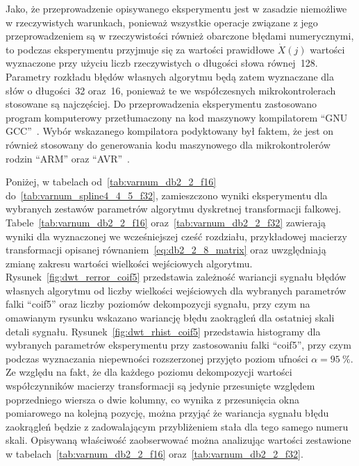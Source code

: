 Jako, że przeprowadzenie opisywanego eksperymentu jest w zasadzie niemożliwe w rzeczywistych warunkach, ponieważ wszystkie operacje związane z jego przeprowadzeniem są w rzeczywistości również obarczone błędami numerycznymi, to podczas eksperymentu przyjmuje się za wartości prawidłowe $\dot{X}(j)$ wartości wyznaczone przy użyciu liczb rzeczywistych o długości słowa równej~\qty{128}{\bitOw}. Parametry rozkładu błędów własnych algorytmu będą zatem wyznaczane dla słów o długości~\qty{32}{\bitOw} oraz~\qty{16}{\bitOw}, ponieważ te we współczesnych mikrokontrolerach stosowane są najczęściej. Do przeprowadzenia eksperymentu zastosowano program komputerowy przetłumaczony na kod maszynowy kompilatorem \enquote{GNU GCC}~\cite{gcc_manual}. Wybór wskazanego kompilatora podyktowany był faktem, że jest on również stosowany do generowania kodu maszynowego dla mikrokontrolerów rodzin \enquote{ARM} oraz \enquote{AVR}~\cite{kim_compilers}.

Poniżej, w tabelach od~\ref{tab:varnum_db2_2_f16} do~\ref{tab:varnum_spline4_4_5_f32}, zamieszczono wyniki eksperymentu dla wybranych zestawów parametrów algorytmu dyskretnej transformacji falkowej. Tabele~\ref{tab:varnum_db2_2_f16} oraz~\ref{tab:varnum_db2_2_f32} zawierają wyniki dla wyznaczonej we wcześniejszej cześć rozdziału, przykładowej macierzy transformacji opisanej równaniem~\eqref{eq:db2_2_8_matrix} oraz uwzględniają zmianę zakresu wartości wielkości wejściowych algorytmu. Rysunek~\ref{fig:dwt_rerror_coif5} przedstawia zależność wariancji sygnału błędów własnych algorytmu od liczby wielkości wejściowych dla wybranych parametrów falki \enquote{coif5} oraz liczby poziomów dekompozycji sygnału, przy czym na omawianym rysunku wskazano wariancję błędu zaokrągleń dla ostatniej skali detali sygnału. Rysunek~\ref{fig:dwt_rhist_coif5} przedstawia histogramy dla wybranych parametrów eksperymentu przy zastosowaniu falki \enquote{coif5}, przy czym podczas wyznaczania niepewności rozszerzonej przyjęto poziom ufności $\alpha = \qty{95}{\percent}$. Ze względu na fakt, że dla każdego poziomu dekompozycji wartości współczynników macierzy transformacji są jedynie przesunięte względem poprzedniego wiersza o dwie kolumny, co wynika z przesunięcia okna pomiarowego na kolejną pozycję, można przyjąć że wariancja sygnału błędu zaokrągleń będzie z zadowalającym przybliżeniem stała dla tego samego numeru skali. Opisywaną właściwość zaobserwować można analizując wartości zestawione w tabelach~\ref{tab:varnum_db2_2_f16} oraz~\ref{tab:varnum_db2_2_f32}.

